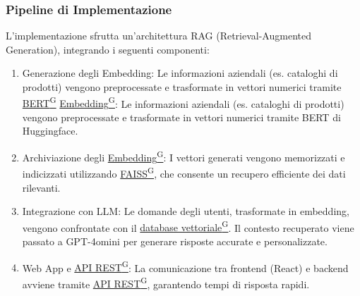 \subsubsection{Pipeline di Implementazione}
L'implementazione sfrutta un'architettura RAG (Retrieval-Augmented Generation), integrando i seguenti componenti:
\begin{enumerate}
    \item Generazione degli Embedding: Le informazioni aziendali (es. cataloghi di prodotti) vengono preprocessate e trasformate in vettori numerici tramite \href{https://code7crusaders.github.io/docs/PB/documentazione_interna/glossario.html#bert-bidirectional-encoder-representations-from-transformers}{BERT\textsuperscript{G}} \href{https://code7crusaders.github.io/docs/PB/documentazione_interna/glossario.html#embedding}{Embedding\textsuperscript{G}}: Le informazioni aziendali (es. cataloghi di prodotti) vengono preprocessate e trasformate in vettori numerici tramite BERT di Huggingface.
    \item Archiviazione degli \href{https://code7crusaders.github.io/docs/PB/documentazione_interna/glossario.html#embedding}{Embedding\textsuperscript{G}}: I vettori generati vengono memorizzati e indicizzati utilizzando \href{https://code7crusaders.github.io/docs/PB/documentazione_interna/glossario.html#faiss}{FAISS\textsuperscript{G}}, che consente un recupero efficiente dei dati rilevanti.
    \item Integrazione con LLM: Le domande degli utenti, trasformate in embedding, vengono confrontate con il \href{https://code7crusaders.github.io/docs/PB/documentazione_interna/glossario.html#database-vettoriale}{database vettoriale\textsuperscript{G}}. Il contesto recuperato viene passato a GPT-4omini per generare risposte accurate e personalizzate.
    \item Web App e \href{https://code7crusaders.github.io/docs/PB/documentazione_interna/glossario.html#api-rest-representational-state-transfer}{API REST\textsuperscript{G}}: La comunicazione tra frontend (React) e backend avviene tramite \href{https://code7crusaders.github.io/docs/PB/documentazione_interna/glossario.html#api-rest-representational-state-transfer}{API REST\textsuperscript{G}}, garantendo tempi di risposta rapidi.
\end{enumerate}

